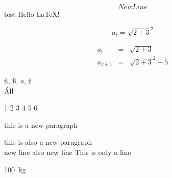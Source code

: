 \documentclass{article}
\begin{document}
$$New Line$$
test
Hello \LaTeX!

\begin{equation}
a_t=\sqrt{2+3}^2
\end{equation}

\begin{eqnarray}
a_t&=&\sqrt{2+3}\\
a_{z+1}&=&\sqrt{2+3}^2+5
\end{eqnarray}

\~n, \ss, \o, \~z \\
Áll

1 2  3   4    5     6

this is a new paragraph\par
this is also a new paragraph\\
new line\newline
also new line\linebreak
This is only a line

100~kg

\newpage

\begin{flushleft}
\blindtext
\end{flushleft}
\begin{flushright}
\blindtext
\end{flushright}
\begin{center}
\blindtext
\end{center}
\blindtext
\end{document}
